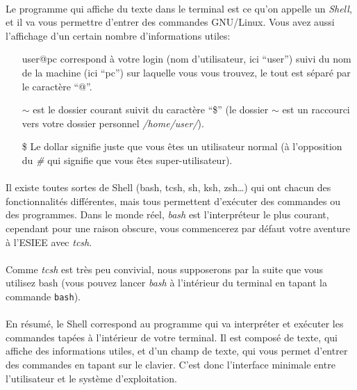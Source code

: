 \newpage
\paragraph{} Le programme qui affiche du texte dans le terminal est ce qu'on
appelle un \emph{Shell}, et il va vous permettre d'entrer des commandes
GNU/Linux. Vous avez aussi l'affichage d'un certain nombre d'informations
utiles:

\begin{enumerate}
	\item[user@pc] correspond à votre login (nom d'utilisateur, ici
		``user'') suivi du nom de la machine (ici ``pc'') sur laquelle
		vous vous trouvez, le tout est séparé par le caractère ``@''.
	\item[$\sim$] est le dossier courant suivit du caractère ``\$''
		(le dossier $\sim$ est un raccourci vers votre dossier personnel
		\emph{/home/user/}).
	\item[\$] Le dollar signifie juste que vous êtes un utilisateur normal (à
		l'opposition du \emph{\#} qui signifie que vous êtes
		super-utilisateur).
\end{enumerate}

\paragraph{} Il existe toutes sortes de Shell (bash, tcsh, sh, ksh, zsh\dots)
qui ont chacun des fonctionnalités différentes, mais tous permettent d'exécuter
des commandes ou des programmes. Dans le monde réel, \emph{bash} est
l'interpréteur le plus courant, cependant pour une raison obscure, vous
commencerez par défaut votre aventure à l'ESIEE avec \emph{tcsh}.

\paragraph{} Comme \emph{tcsh} est très peu convivial, nous supposerons par la
suite que vous utilisez bash (vous pouvez lancer \emph{bash} à l'intérieur du
terminal en tapant la commande \texttt{bash}).

\paragraph{} En résumé, le Shell correspond au programme qui va interpréter et
exécuter les commandes tapées à l'intérieur de votre terminal. Il est composé
de texte, qui affiche des informations utiles, et d'un champ de texte, qui vous
permet d'entrer des commandes en tapant sur le clavier. C'est donc l'interface
minimale entre l'utilisateur et le système d'exploitation.

